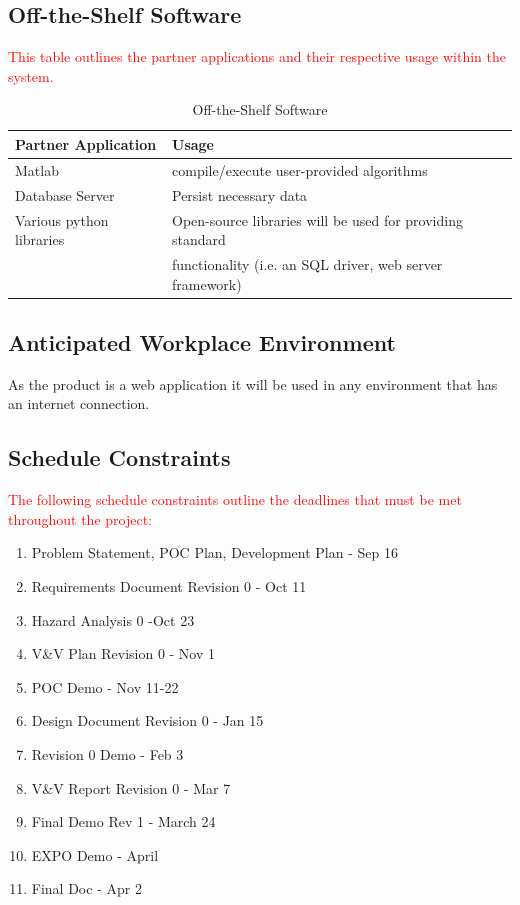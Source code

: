 \documentclass[12pt]{article}
\begin{document}
\subsection{Off-the-Shelf Software}
\textcolor{red}{This table outlines the partner applications and their respective usage within the system.}

\begin{table}[H]
    \centering
    \begin{tabular}{|l|l|}
         \hline \textbf{Partner Application} & \textbf{Usage} \\
         \hline Matlab & compile/execute user-provided algorithms \\
         \hline Database Server & Persist necessary data \\
         \hline Various python libraries & Open-source libraries will be used for providing standard \\
         & functionality (i.e. an SQL driver, web server framework)\\
         \hline
    \end{tabular}
    \caption{Off-the-Shelf Software}
\end{table}
\subsection{Anticipated Workplace Environment}
As the product is a web application it will be used in any environment that has an internet connection. 
\subsection{Schedule Constraints}
\textcolor{red}{The following schedule constraints outline the deadlines that must be met throughout the project:}
\begin{enumerate}
    \item Problem Statement, POC Plan, Development Plan - Sep 16
    \item Requirements Document Revision 0 - Oct 11
    \item Hazard Analysis 0 -Oct 23
    \item V\&V Plan Revision 0 - Nov 1
    \item POC Demo - Nov 11-22
    \item Design Document Revision 0 - Jan 15
    \item Revision 0 Demo - Feb 3
    \item V\&V Report Revision 0 - Mar 7
    \item Final Demo Rev 1 - March 24
    \item EXPO Demo - April
    \item Final Doc - Apr 2
\end{enumerate}
\end{document}

